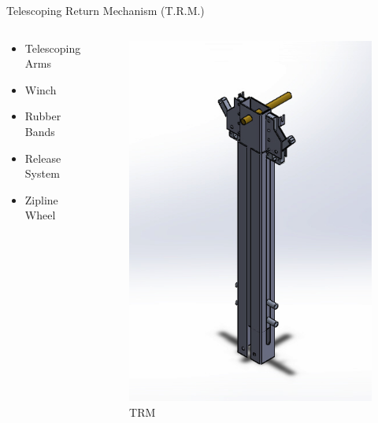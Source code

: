 \documentclass[aspectratio=43]{beamer}
\begin{document}
  \begin{frame}{Telescoping Return Mechanism (T.R.M.)}
    \begin{columns}[c]
      \begin{column}[c]{5cm}
        \begin{itemize}
          \item Telescoping Arms
          \item Winch
          \item Rubber Bands
          \item Release System
          \item Zipline Wheel
        \end{itemize}
      \end{column}
      \begin{column}[c]{5cm}
        \begin{figure}[h]
          \centering
          \includegraphics[scale = 0.275]{TRM.png}
          \vspace{7pt}
          \large{TRM}
        \end{figure}
      \end{column}
    \end{columns}
  \end{frame} 
\end{document}
